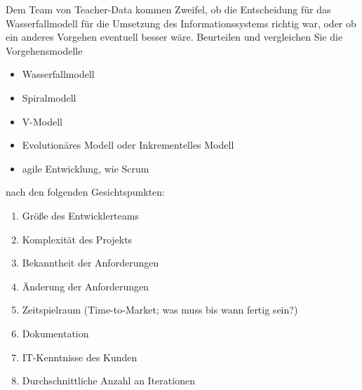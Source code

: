 \documentclass{bschlangaul-aufgabe}
\begin{document}
%


Dem Team von Teacher-Data kommen Zweifel, ob die Entscheidung für das
Wasserfallmodell für die Umsetzung des Informationssystems richtig war,
oder ob ein anderes Vorgehen eventuell besser wäre. Beurteilen und
vergleichen Sie die Vorgehensmodelle

\begin{itemize}
\item Wasserfallmodell
\item Spiralmodell
\item V-Modell
\item Evolutionäres Modell oder
Inkrementelles Modell
\item agile Entwicklung, wie \zB Scrum
\end{itemize}

\noindent
nach den folgenden Gesichtspunkten:

\begin{enumerate}
\item Größe des Entwicklerteams
\item Komplexität des Projekts
\item Bekanntheit der Anforderungen
\item Änderung der Anforderungen
\item Zeitspielraum (Time-to-Market; was muss bis wann fertig sein?)
\item Dokumentation
\item IT-Kenntnisse des Kunden
\item Durchschnittliche Anzahl an Iterationen
\end{enumerate}
\end{document}
